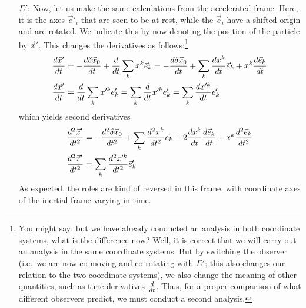 \documentclass[../class_mech_main.tex]{subfiles}
\begin{document}
\begin{itemize}
	\item[$\Sigma'$:] Now, let us make the same calculations from the accelerated frame. Here, it is the axes $\vec{e}'_i$ that are seen to be at rest, while the $\vec{e}_i$ have a shifted origin and are rotated. We indicate this by now denoting the position of the particle by $\vec{x}'$. This changes the derivatives as follows:\footnote{You might say: but we have already conducted an analysis in both coordinate systems, what is the difference now? Well, it is correct that we will carry out an analysis in the same coordinate systems. But by switching the observer (i.e.~we are now co-moving and co-rotating with $\Sigma'$; this also changes our relation to the two coordinate systems), we also change the meaning of other quantities, such as time derivatives $\dv{t}$. Thus, for a proper comparison of what different observers predict, we must conduct a second analysis.}
	\begin{align}
		\dv{\vec{x}'}{t} &= -\dv{\delta \vec{x}_0}{t} + \dv{t} \sum_k x^k\vec{e}_k = -\dv{\delta \vec{x}_0}{t} + \sum_k \dv{x^k}{t} \vec{e}_k + x^k \dv{\vec{e}_k}{t}
		\label{eq:velocity_from_accel_frame_in_inert_frame}
		\\
		\dv{\vec{x}'}{t} &= \dv{t} \sum_k x'^k \vec{e}'_k = \sum_k \dv{t} x'^k \vec{e}'_k = \sum_k \dv{x'^k}{t} \vec{e}'_k
		\label{eq:velocity_from_accel_frame_in_accel_frame}
	\end{align}
	which yields second derivatives
	\begin{align}
		\dv[2]{\vec{x}'}{t} &= -\dv[2]{\delta \vec{x}_0}{t} + \sum_k \dv[2]{x^k}{t} \vec{e}_k + 2 \dv{x^k}{t} \dv{\vec{e}_k}{t} + x^k \dv[2]{\vec{e}_k}{t}
		\label{eq:acceleration_from_accel_frame_in_inert_frame}
		\\
		\dv[2]{\vec{x}'}{t} &= \sum_k \dv[2]{x'^k}{t} \vec{e}'_k
		\label{eq:acceleration_from_accel_frame_in_accel_frame}
	\end{align}
	As expected, the roles are kind of reversed in this frame, with coordinate axes of the inertial frame varying in time.



\end{itemize}
\end{document}
